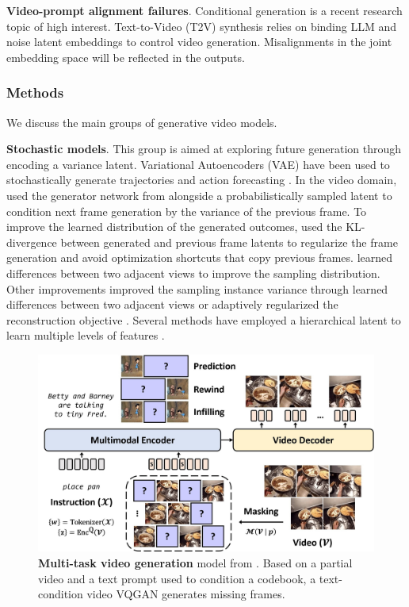 \noindent
\textbf{Video-prompt alignment failures}. Conditional generation is a recent research topic of high interest. Text-to-Video (T2V) synthesis relies on binding LLM and noise latent embeddings to control video generation. Misalignments in the joint embedding space will be reflected in the outputs.



\subsubsection{Methods}

We discuss the main groups of generative video models.

\noindent
\textbf{Stochastic models}. This group is aimed at exploring future generation through encoding a variance latent. Variational Autoencoders (VAE) \citep{kingma2013auto} have been used to stochastically generate trajectories \citep{walker2016uncertain} and action forecasting \citep{fragkiadaki2017motion}. In the video domain,  \citet{babaeizadeh2018stochastic} used the generator network from \citet{finn2016unsupervised} alongside a probabilistically sampled latent to condition next frame generation by the variance of the previous frame. To improve the learned distribution of the generated outcomes, \citet{denton2018stochastic} used the KL-divergence between generated and previous frame latents to regularize the frame generation and avoid optimization shortcuts that copy previous frames. \citet{yan2018mt} learned differences between two adjacent views to improve the sampling distribution. Other improvements improved the sampling instance variance through learned differences between two adjacent views \citep{franceschi2020stochastic} or adaptively regularized the reconstruction objective \citep{chatterjee2021hierarchical}. Several methods have employed a hierarchical latent to learn multiple levels of features \citep{castrejon2019improved,kumar2020videoflow,saxena2021clockwork}. 

\begin{figure}[t]
    \includegraphics[width=\linewidth]{figs/fig_mmvg.jpg}
    \caption{\textbf{Multi-task video generation} model from \citet{fu2023tell}. Based on a partial video and a text prompt used to condition a codebook, a text-condition video VQGAN generates missing frames.}
    \label{fig:mmvg}
\end{figure}


